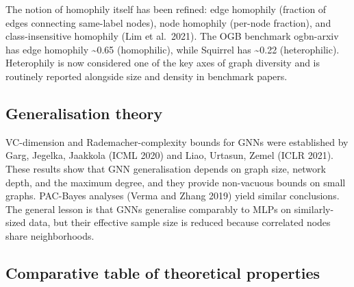 The notion of homophily itself has been refined: edge homophily (fraction of edges connecting same-label nodes), node homophily (per-node fraction), and class-insensitive homophily (Lim et al.~2021). The OGB benchmark ogbn-arxiv has edge homophily \textasciitilde0.65 (homophilic), while Squirrel has \textasciitilde0.22 (heterophilic). Heterophily is now considered one of the key axes of graph diversity and is routinely reported alongside size and density in benchmark papers.

\subsection{Generalisation theory}\label{generalisation-theory}

VC-dimension and Rademacher-complexity bounds for GNNs were established by Garg, Jegelka, Jaakkola (ICML 2020) and Liao, Urtasun, Zemel (ICLR 2021). These results show that GNN generalisation depends on graph size, network depth, and the maximum degree, and they provide non-vacuous bounds on small graphs. PAC-Bayes analyses (Verma and Zhang 2019) yield similar conclusions. The general lesson is that GNNs generalise comparably to MLPs on similarly-sized data, but their effective sample size is reduced because correlated nodes share neighborhoods.

\subsection{Comparative table of theoretical properties}\label{comparative-table-of-theoretical-properties}

